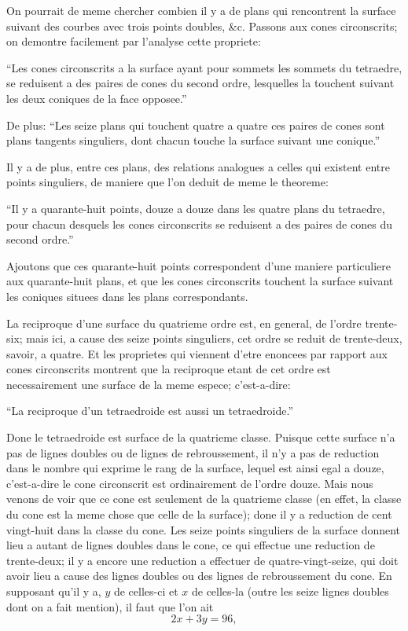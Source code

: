\documentclass[11pt,a4paper]{article}
\begin{document}
On pourrait de meme chercher combien il y a de plans qui rencontrent la surface suivant des courbes avec trois points doubles, \&c. Passons aux cones circonscrits; on demontre facilement par l'analyse cette propriete:

``Les cones circonscrits a la surface ayant pour sommets les sommets du tetraedre, se reduisent a des paires de cones du second ordre, lesquelles la touchent suivant les deux coniques de la face opposee.''

De plus: ``Les seize plans qui touchent quatre a quatre ces paires de cones sont plans tangents singuliers, dont chacun touche la surface suivant une conique.''

Il y a de plus, entre ces plans, des relations analogues a celles qui existent entre points singuliers, de maniere que l'on deduit de meme le theoreme:

``Il y a quarante-huit points, douze a douze dans les quatre plans du tetraedre, pour chacun desquels les cones circonscrits se reduisent a des paires de cones du second ordre.''

Ajoutons que ces quarante-huit points correspondent d'une maniere particuliere aux quarante-huit plans, et que les cones circonscrits touchent la surface suivant les coniques situees dans les plans correspondants.

La reciproque d'une surface du quatrieme ordre est, en general, de l'ordre trente-six; mais ici, a cause des seize points singuliers, cet ordre se reduit de trente-deux, savoir, a quatre. Et les proprietes qui viennent d'etre enoncees par rapport aux cones circonscrits montrent que la reciproque etant de cet ordre est necessairement une surface de la meme espece; c'est-a-dire:

``La reciproque d'un tetraedroide est aussi un tetraedroide.''

Done le tetraedroide est surface de la quatrieme classe. Puisque cette surface n'a pas de lignes doubles ou de lignes de rebroussement, il n'y a pas de reduction dans le nombre qui exprime le rang de la surface, lequel est ainsi egal a douze, c'est-a-dire le cone circonscrit est ordinairement de l'ordre douze. Mais nous venons de voir que ce cone est seulement de la quatrieme classe (en effet, la classe du cone est la meme chose que celle de la surface); done il y a reduction de cent vingt-huit dans la classe du cone. Les seize points singuliers de la surface donnent lieu a autant de lignes doubles dans le cone, ce qui effectue une reduction de trente-deux; il y a encore une reduction a effectuer de quatre-vingt-seize, qui doit avoir lieu a cause des lignes doubles ou des lignes de rebroussement du cone. En supposant qu'il y a, $y$ de celles-ci et $x$ de celles-la (outre les seize lignes doubles dont on a fait mention), il faut que l'on ait
\[
2x + 3y = 96,
\]
\end{document}
